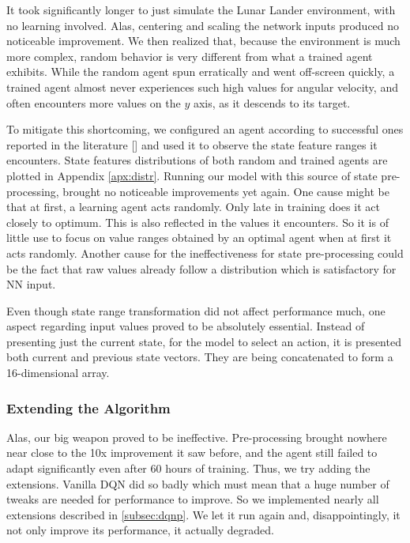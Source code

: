 \documentclass{article}
\begin{document}
It took significantly longer to just simulate the Lunar Lander environment, with no learning involved. Alas, centering and scaling the network inputs produced no noticeable improvement. We then realized that, because the environment is much more complex, random behavior is very different from what a trained agent exhibits. While the random agent spun erratically and went off-screen quickly, a trained agent almost never experiences such high values for angular velocity, and often encounters more values on the $y$ axis, as it descends to its target.

To mitigate this shortcoming, we configured an agent according to successful ones reported in the literature [\cite{oail}] and used it to observe the state feature ranges it encounters. State features distributions of both random and trained agents are plotted in Appendix \ref{apx:distr}. Running our model with this source of state pre-processing, brought no noticeable improvements yet again. One cause might be that at first, a learning agent acts randomly. Only late in training does it act closely to optimum. This is also reflected in the values it encounters. So it is of little use to focus on value ranges obtained by an optimal agent when at first it acts randomly. Another cause for the ineffectiveness for state pre-processing could be the fact that raw values already follow a distribution which is satisfactory for NN input.

Even though state range transformation did not affect performance much, one aspect regarding input values proved to be absolutely essential. Instead of presenting just the current state, for the model to select an action, it is presented both current and previous state vectors. They are being concatenated to form a 16-dimensional array.


\subsubsection{Extending the Algorithm}

Alas, our big weapon proved to be ineffective. Pre-processing brought nowhere near close to the 10x improvement it saw before, and the agent still failed to adapt significantly even after 60 hours of training.  Thus, we try adding the extensions. Vanilla DQN did so badly which must mean that a huge number of tweaks are needed for performance to improve. So we implemented nearly all extensions described in \ref{subsec:dqnp}. We let it run again and, disappointingly, it not only improve its performance, it actually degraded.
\end{document}
